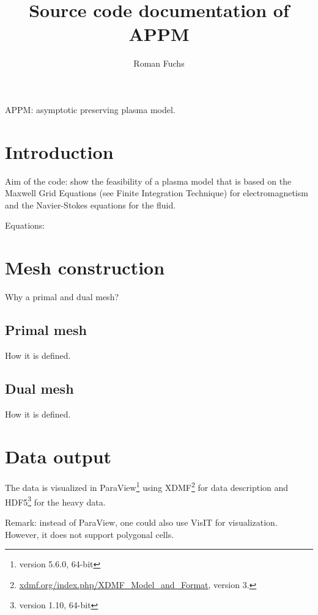 \documentclass{article}
\title{Source code documentation of APPM}
\author{Roman Fuchs}
\begin{document}
\maketitle

\tableofcontents

\vspace{2em}

APPM: asymptotic preserving plasma model.

\section{Introduction}

Aim of the code: show the feasibility of a plasma model that is based 
on the Maxwell Grid Equations (see Finite Integration Technique) for 
electromagnetism and the Navier-Stokes equations for the fluid. 

Equations:



\section{Mesh construction}

Why a primal and dual mesh?


\subsection{Primal mesh}

How it is defined.



\subsection{Dual mesh}

How it is defined.



\section{Data output}

The data is visualized in ParaView\footnote{version 5.6.0, 64-bit} 
using XDMF\footnote{\url{xdmf.org/index.php/XDMF_Model_and_Format}, version 3.} 
for data description and HDF5\footnote{version 1.10, 64-bit} 
for the heavy data.

Remark: instead of ParaView, one could also use VisIT for visualization. However, it does not support polygonal cells. 
\end{document}
